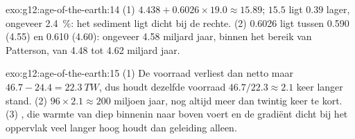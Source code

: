 \begin{solution}{exo:g12:age-of-the-earth:14}
(1) $4.438 + 0.6026 \times 19.0 \approx 15.89$; $15.5$ ligt $0.39$ lager,
ongeveer \qty{2.4}{\percent}: het sediment ligt dicht bij de rechte. (2) 0.6026
ligt tussen 0.590 (4.55) en 0.610 (4.60): ongeveer 4.58 miljard jaar, binnen
het bereik van Patterson, van 4.48 tot 4.62 miljard jaar.
\end{solution}

\begin{solution}{exo:g12:age-of-the-earth:15}
(1) De voorraad verliest dan netto maar $46.7 - 24.4 = \qty{22.3}{TW}$, dus
houdt dezelfde voorraad $46.7/22.3 \approx 2.1$ keer langer stand. (2) $96 \times 2.1 \approx
200$ miljoen jaar, nog altijd meer dan twintig keer te kort. (3)
, die warmte van diep binnenin naar boven voert en de gradiënt
dicht bij het oppervlak veel langer hoog houdt dan geleiding alleen.
\end{solution}

